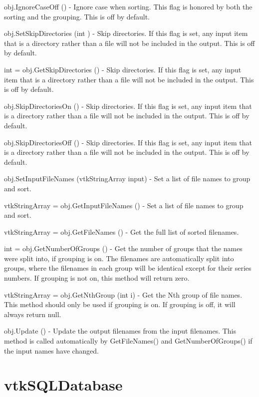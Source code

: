 \begin{DoxyItemize}
\item {\ttfamily obj.\-Ignore\-Case\-Off ()} -\/ Ignore case when sorting. This flag is honored by both the sorting and the grouping. This is off by default.  
\item {\ttfamily obj.\-Set\-Skip\-Directories (int )} -\/ Skip directories. If this flag is set, any input item that is a directory rather than a file will not be included in the output. This is off by default.  
\item {\ttfamily int = obj.\-Get\-Skip\-Directories ()} -\/ Skip directories. If this flag is set, any input item that is a directory rather than a file will not be included in the output. This is off by default.  
\item {\ttfamily obj.\-Skip\-Directories\-On ()} -\/ Skip directories. If this flag is set, any input item that is a directory rather than a file will not be included in the output. This is off by default.  
\item {\ttfamily obj.\-Skip\-Directories\-Off ()} -\/ Skip directories. If this flag is set, any input item that is a directory rather than a file will not be included in the output. This is off by default.  
\item {\ttfamily obj.\-Set\-Input\-File\-Names (vtk\-String\-Array input)} -\/ Set a list of file names to group and sort.  
\item {\ttfamily vtk\-String\-Array = obj.\-Get\-Input\-File\-Names ()} -\/ Set a list of file names to group and sort.  
\item {\ttfamily vtk\-String\-Array = obj.\-Get\-File\-Names ()} -\/ Get the full list of sorted filenames.  
\item {\ttfamily int = obj.\-Get\-Number\-Of\-Groups ()} -\/ Get the number of groups that the names were split into, if grouping is on. The filenames are automatically split into groups, where the filenames in each group will be identical except for their series numbers. If grouping is not on, this method will return zero.  
\item {\ttfamily vtk\-String\-Array = obj.\-Get\-Nth\-Group (int i)} -\/ Get the Nth group of file names. This method should only be used if grouping is on. If grouping is off, it will always return null.  
\item {\ttfamily obj.\-Update ()} -\/ Update the output filenames from the input filenames. This method is called automatically by Get\-File\-Names() and Get\-Number\-Of\-Groups() if the input names have changed.  
\end{DoxyItemize}\hypertarget{vtkio_vtksqldatabase}{}\section{vtk\-S\-Q\-L\-Database}\label{vtkio_vtksqldatabase}
